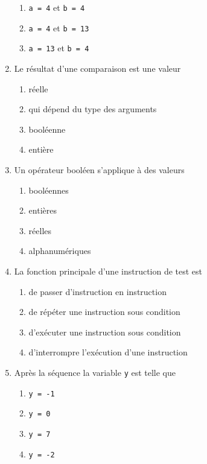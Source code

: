 \begin{td}[QCM (2)]
\begin{enumerate}
\begin{enumerate}
	\item {\tt a = 4} et {\tt b = 4}
	\item {\tt a = 4} et {\tt b = 13}
	\item {\tt a = 13} et {\tt b = 4}
	\end{enumerate}
\item Le résultat d'une comparaison est une valeur
	\begin{enumerate}
	\item réelle
	\item qui dépend du type des arguments 
	\item booléenne
	\item entière
	\end{enumerate}
\item Un opérateur booléen s'applique à des valeurs
	\begin{enumerate}
	\item booléennes
	\item entières
	\item réelles
	\item alphanumériques
	\end{enumerate}
\item La fonction principale d'une instruction de test est
	\begin{enumerate}
	\item de passer d'instruction en instruction
	\item de répéter une instruction sous condition
	\item d'exécuter une instruction sous condition
	\item d'interrompre l'exécution d'une instruction
	\end{enumerate}
\item Après la séquence  la variable {\tt y} est telle que
	\begin{enumerate}
	\item {\tt y = -1}
	\item {\tt y = 0}
	\item {\tt y = 7}
	\item {\tt y = -2}
	\end{enumerate}

\end{enumerate}
\end{td}
